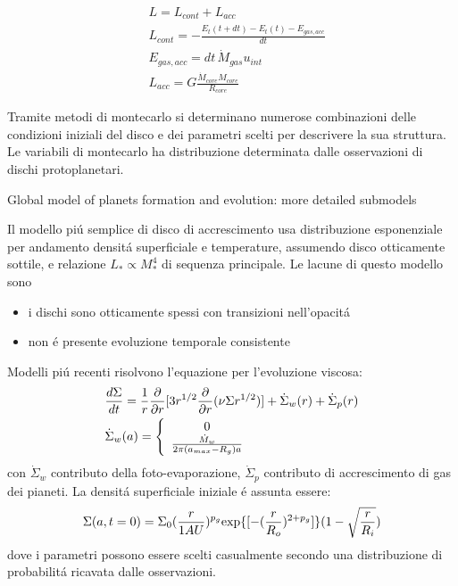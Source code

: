 \begin{workout}
\begin{align}
&L=L_{cont}+L_{acc}\\
&L_{cont}=-\frac{E_t(t+dt)-E_t(t)-E_{gas,acc}}{dt}\\
&E_{gas,acc}=dt\,\dot{M}_{gas}u_{int}\\
&L_{acc}=G\frac{\dot{M}_{core}M_{core}}{R_{core}}
\end{align}
\end{workout}


Tramite metodi di montecarlo si determinano numerose combinazioni delle condizioni iniziali del disco e dei parametri scelti per descrivere la sua struttura.
Le variabili di montecarlo ha distribuzione determinata dalle osservazioni di dischi protoplanetari.

\begin{workout}
Global model of planets formation and evolution: more detailed submodels
\end{workout}

Il modello pi\'u semplice di disco di accrescimento usa distribuzione esponenziale per andamento densit\'a superficiale e temperature, assumendo disco otticamente sottile, e relazione $L_*\propto M_*^4$ di sequenza principale. Le lacune di questo modello sono
\begin{itemize}
\item i dischi sono otticamente spessi con transizioni nell'opacit\'a
\item non \'e presente evoluzione temporale consistente
\end{itemize}

Modelli pi\'u recenti  risolvono l'equazione per l'evoluzione viscosa:
\begin{align}
&\frac{d \Sigma}{d t}=\frac{1}{r}\frac{\partial}{\partial r}[3r^{1/2}\frac{\partial}{\partial r}(\nu\Sigma r^{1/2})]+\dot{\Sigma}_w(r)+\dot{\Sigma}_p(r)\label{eq:diskaccrphev-m18}\\
&\dot{\Sigma}_w(a)=\left\{\begin{array}{c}0\\\frac{\dot{M}_w}{2\pi(a_{max}-R_g)a}\\\end{array}\right.
\end{align}
con $\dot{\Sigma}_w$ contributo della foto-evaporazione,  $\dot{\Sigma}_p$ contributo di accrescimento di gas dei pianeti.
La densit\'a superficiale iniziale \'e assunta essere:
\begin{equation}
\Sigma(a,t=0)=\Sigma_0(\frac{r}{1AU})^{p_g}\text{exp}\{[-(\frac{r}{R_o})^{2+p_g}]\}(1-\sqrt{\frac{r}{R_i}})
\end{equation}
dove i parametri possono essere scelti casualmente secondo una distribuzione di probabilit\'a ricavata dalle osservazioni.

